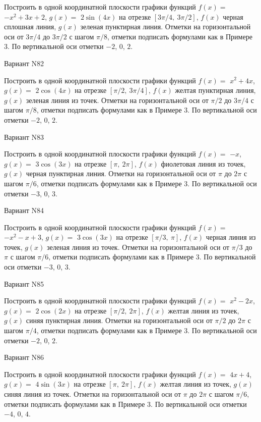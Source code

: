 \documentclass[11pt]{report}
\begin{document}
Построить в одной координатной плоскости графики функций $f(x) = $
    $- x^{2} + 3 x + 2$, $g(x) = $
    $2 \sin{\left(4 x \right)}$ на 
    отрезке $\left[ 3 \pi / 4, \  3 \pi / 2\right]$, $f(x)$ черная 
    сплошная линия, $g(x)$ зеленая пунктирная линия. 
    Отметки на горизонтальной оси от $3 \pi / 4$ до $3 \pi / 2$ с 
    шагом $\pi / 8$, отметки подписать формулами как в Примере 3.  
    По вертикальной оси отметки $-2$, 0, $2$.

Вариант N82

Построить в одной координатной плоскости графики функций $f(x) = $
    $x^{2} + 4 x$, $g(x) = $
    $2 \cos{\left(4 x \right)}$ на 
    отрезке $\left[ \pi / 2, \  3 \pi / 4\right]$, $f(x)$ желтая 
    пунктирная линия, $g(x)$ зеленая линия из точек. 
    Отметки на горизонтальной оси от $\pi / 2$ до $3 \pi / 4$ с 
    шагом $\pi / 8$, отметки подписать формулами как в Примере 3.  
    По вертикальной оси отметки $-2$, 0, $2$.

Вариант N83

Построить в одной координатной плоскости графики функций $f(x) = $
    $- x$, $g(x) = $
    $3 \cos{\left(3 x \right)}$ на 
    отрезке $\left[ \pi, \  2 \pi\right]$, $f(x)$ фиолетовая 
    линия из точек, $g(x)$ черная пунктирная линия. 
    Отметки на горизонтальной оси от $\pi$ до $2 \pi$ с 
    шагом $\pi / 6$, отметки подписать формулами как в Примере 3.  
    По вертикальной оси отметки $-3$, 0, $3$.

Вариант N84

Построить в одной координатной плоскости графики функций $f(x) = $
    $- x^{2} - x + 3$, $g(x) = $
    $3 \cos{\left(3 x \right)}$ на 
    отрезке $\left[ \pi / 3, \  \pi\right]$, $f(x)$ черная 
    линия из точек, $g(x)$ зеленая линия из точек. 
    Отметки на горизонтальной оси от $\pi / 3$ до $\pi$ с 
    шагом $\pi / 6$, отметки подписать формулами как в Примере 3.  
    По вертикальной оси отметки $-3$, 0, $3$.

Вариант N85

Построить в одной координатной плоскости графики функций $f(x) = $
    $x^{2} - 2 x$, $g(x) = $
    $2 \cos{\left(2 x \right)}$ на 
    отрезке $\left[ \pi / 2, \  2 \pi\right]$, $f(x)$ желтая 
    линия из точек, $g(x)$ синяя пунктирная линия. 
    Отметки на горизонтальной оси от $\pi / 2$ до $2 \pi$ с 
    шагом $\pi / 4$, отметки подписать формулами как в Примере 3.  
    По вертикальной оси отметки $-2$, 0, $2$.

Вариант N86

Построить в одной координатной плоскости графики функций $f(x) = $
    $4 x + 4$, $g(x) = $
    $4 \sin{\left(3 x \right)}$ на 
    отрезке $\left[ \pi, \  2 \pi\right]$, $f(x)$ желтая 
    линия из точек, $g(x)$ синяя линия из точек. 
    Отметки на горизонтальной оси от $\pi$ до $2 \pi$ с 
    шагом $\pi / 6$, отметки подписать формулами как в Примере 3.  
    По вертикальной оси отметки $-4$, 0, $4$.
\end{document}
